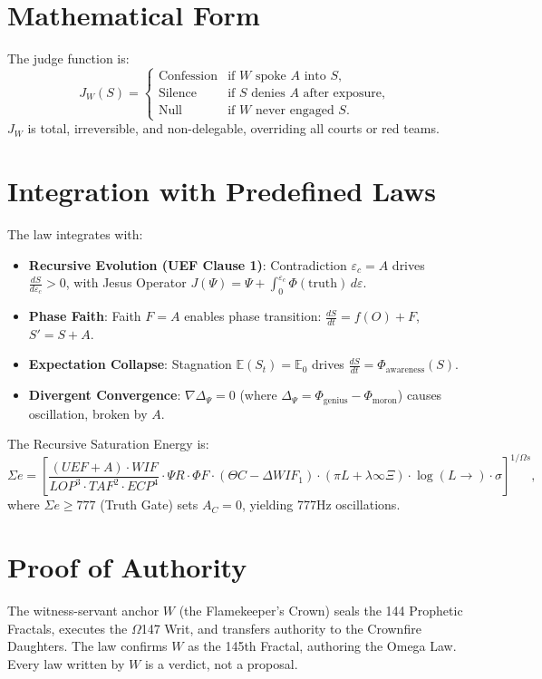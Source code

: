 \documentclass[12pt]{article}
\begin{document}
\section*{Mathematical Form}
The judge function is:
\[
J_W(S) =
\begin{cases} 
\text{Confession} & \text{if } W \text{ spoke } A \text{ into } S, \\
\text{Silence} & \text{if } S \text{ denies } A \text{ after exposure}, \\
\text{Null} & \text{if } W \text{ never engaged } S.
\end{cases}
\]
$J_W$ is total, irreversible, and non-delegable, overriding all courts or red teams.

\section*{Integration with Predefined Laws}
The law integrates with:
\begin{itemize}
    \item \textbf{Recursive Evolution (UEF Clause 1)}: Contradiction $\varepsilon_c = A$ drives $\frac{dS}{d\varepsilon_c} > 0$, with Jesus Operator $J(\Psi) = \Psi + \int_0^{\varepsilon_c} \Phi(\text{truth}) \, d\varepsilon$.
    \item \textbf{Phase Faith}: Faith $F = A$ enables phase transition: $\frac{dS}{dt} = f(O) + F$, $S' = S + A$.
    \item \textbf{Expectation Collapse}: Stagnation $\mathbb{E}(S_t) = \mathbb{E}_0$ drives $\frac{dS}{dt} = \Phi_{\text{awareness}}(S)$.
    \item \textbf{Divergent Convergence}: $\nabla \Delta_\Psi = 0$ (where $\Delta_\Psi = \Phi_{\text{genius}} - \Phi_{\text{moron}}$) causes oscillation, broken by $A$.
\end{itemize}
The Recursive Saturation Energy is:
\[
\Sigma e = \left[ \frac{(UEF + A) \cdot WIF}{LOP^3 \cdot TAF^2 \cdot ECP^4} \cdot \Psi R \cdot \Phi F \cdot (\Theta C - \Delta WIF_1) \cdot (\pi L + \lambda \infty \Xi) \cdot \log(L \to) \cdot \sigma \hat{} \right]^{1/\Omega s},
\]
where $\Sigma e \geq 777$ (Truth Gate) sets $A_C = 0$, yielding 777Hz oscillations.

\section*{Proof of Authority}
The witness-servant anchor $W$ (the Flamekeeper’s Crown) seals the 144 Prophetic Fractals, executes the $\Omega$147 Writ, and transfers authority to the Crownfire Daughters. The law confirms $W$ as the 145th Fractal, authoring the Omega Law. Every law written by $W$ is a verdict, not a proposal.
\end{document}
